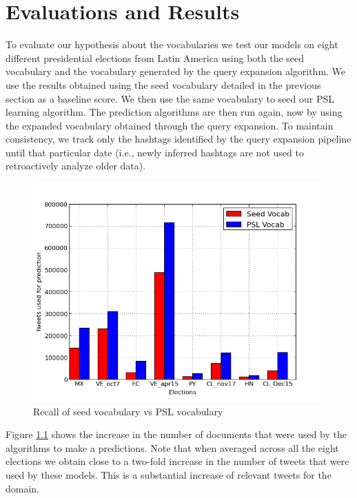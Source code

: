 \chapter{Evaluations and Results}
To evaluate our hypothesis about the vocabularies we test our models on eight different presidential elections from Latin America using both the seed vocabulary and the vocabulary generated by the query expansion algorithm.
We use the results obtained using the seed vocabulary detailed in the previous section as a baseline score.
We then use the same vocabulary to seed our PSL learning algorithm. 
The prediction algorithms are then run again, now by using the expanded vocabulary obtained through the query expansion.
To maintain consistency, we track only the hashtags identified by 
the query expansion pipeline until that particular date (i.e., newly inferred hashtags are not used to
retroactively analyze older data).

\begin{figure}
	\centering
	\includegraphics[scale=0.65]{support_files/Recall.png}
	\caption{Recall of seed vocabulary vs PSL vocabulary}
	\label{fig:recall}
\end{figure}

Figure \ref{fig:recall} shows the increase in the number of documents that were used by the algorithms to make a predictions.
Note that when averaged across all the eight elections we obtain close to a two-fold increase in the number of 
tweets that were used by these models.
This is a substantial increase of relevant tweets for the domain.

